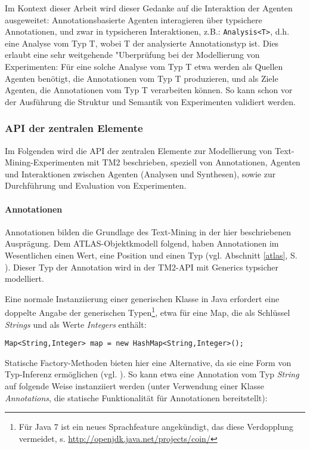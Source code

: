 \documentclass[abstracton, 12pt]{scrartcl}
\begin{document}
Im Kontext dieser Arbeit wird dieser Gedanke auf die Interaktion der Agenten ausgeweitet: Annotationsbasierte Agenten interagieren über typsichere Annotationen, und zwar in typsicheren Interaktionen, z.B.: \lstinline!Analysis<T>!, d.h. eine Analyse vom Typ T, wobei T der analysierte Annotationstyp ist. Dies erlaubt eine sehr weitgehende "Uberprüfung bei der Modellierung von Experimenten: Für eine solche Analyse vom Typ T etwa werden als Quellen Agenten benötigt, die Annotationen vom Typ T produzieren, und als Ziele Agenten, die Annotationen vom Typ T verarbeiten können. So kann schon vor der Ausführung die Struktur und Semantik von Experimenten validiert werden.

\subsubsection{API der zentralen Elemente} \label{api}

Im Folgenden wird die API der zentralen Elemente zur Modellierung von Text-Mining-Ex\-pe\-ri\-ment\-en mit TM2 beschrieben, speziell von Annotationen, Agenten und Interaktionen zwischen Agenten (Analysen und Synthesen), sowie zur Durchführung und Evaluation von Experimenten.

\lstset{language=Java}

\paragraph{Annotationen}

Annotationen bilden die Grundlage des Text-Mining in der hier beschriebenen Ausprägung. Dem ATLAS-Objektkmodell folgend, haben Annotationen im Wesentlichen einen Wert, eine Position und einen Typ (vgl. Abschnitt \ref{atlas}, S. \pageref{atlas}). Dieser Typ der Annotation wird in der TM2-API mit Generics typsicher modelliert.

Eine normale Instanziierung einer generischen Klasse in Java erfordert eine doppelte Angabe der generischen Typen\footnote{Für Java 7 ist ein neues Sprachfeature angekündigt, das diese Verdopplung vermeidet, s. \url{http://openjdk.java.net/projects/coin/}}, etwa für eine Map, die als Schlüssel \emph{Strings} und als Werte \emph{Integers} enthält: 

\begin{lstlisting}
Map<String,Integer> map = new HashMap<String,Integer>();
\end{lstlisting}

Statische Factory-Methoden bieten hier eine Alternative, da sie eine Form von Typ-Inferenz er\-mög\-lich\-en (vgl. \citealt[9]{Bloch2008}). So kann etwa eine Annotation vom Typ \emph{String} auf folgende Weise instanziiert werden (unter Verwendung einer Klasse \emph{Annotations}, die statische Funktionalität für Annotationen bereitstellt): 
\end{document}

